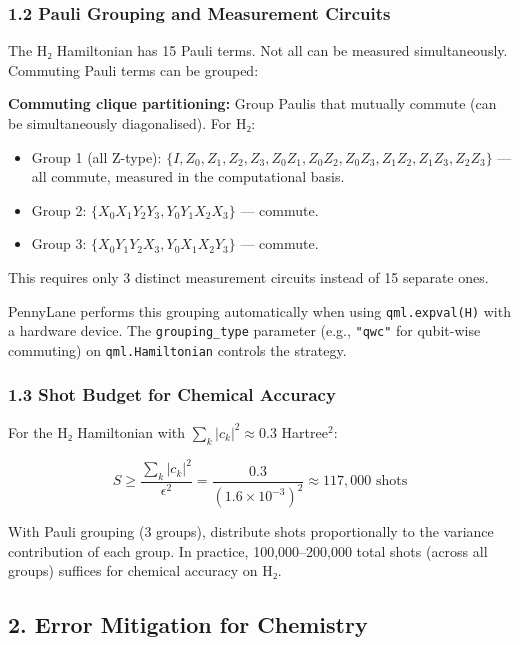 \documentclass[
  11pt,
]{report}
\providecommand{\tightlist}{%
  \setlength{\itemsep}{0pt}\setlength{\parskip}{0pt}}
\begin{document}
\subsubsection{1.2 Pauli Grouping and Measurement
Circuits}\label{pauli-grouping-and-measurement-circuits}

The H₂ Hamiltonian has 15 Pauli terms. Not all can be measured
simultaneously. Commuting Pauli terms can be grouped:

\textbf{Commuting clique partitioning:} Group Paulis that mutually
commute (can be simultaneously diagonalised). For H₂:

\begin{itemize}
\tightlist
\item
  Group 1 (all Z-type):
  \(\{I, Z_0, Z_1, Z_2, Z_3, Z_0Z_1, Z_0Z_2, Z_0Z_3, Z_1Z_2, Z_1Z_3, Z_2Z_3\}\)
  --- all commute, measured in the computational basis.
\item
  Group 2: \(\{X_0X_1Y_2Y_3, Y_0Y_1X_2X_3\}\) --- commute.
\item
  Group 3: \(\{X_0Y_1Y_2X_3, Y_0X_1X_2Y_3\}\) --- commute.
\end{itemize}

This requires only 3 distinct measurement circuits instead of 15
separate ones.

PennyLane performs this grouping automatically when using
\texttt{qml.expval(H)} with a hardware device. The
\texttt{grouping\_type} parameter (e.g., \texttt{"qwc"} for qubit-wise
commuting) on \texttt{qml.Hamiltonian} controls the strategy.

\subsubsection{1.3 Shot Budget for Chemical
Accuracy}\label{shot-budget-for-chemical-accuracy}

For the H₂ Hamiltonian with \(\sum_k |c_k|^2 \approx 0.3\)
Hartree\(^2\):

\[S \geq \frac{\sum_k |c_k|^2}{\epsilon^2} = \frac{0.3}{(1.6 \times 10^{-3})^2} \approx 117{,}000 \text{ shots}\]

With Pauli grouping (3 groups), distribute shots proportionally to the
variance contribution of each group. In practice, 100,000--200,000 total
shots (across all groups) suffices for chemical accuracy on H₂.

\subsection{2. Error Mitigation for
Chemistry}\label{error-mitigation-for-chemistry}
\end{document}
